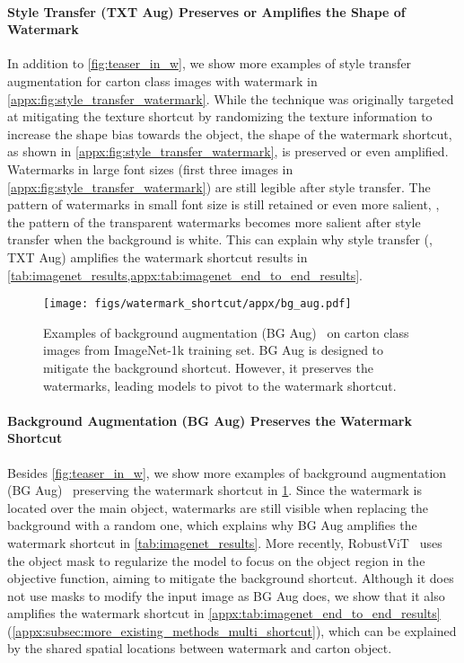 \documentclass[10pt,twocolumn,letterpaper]{article}
\begin{document}
\clearpage

\paragraph{Style Transfer (TXT Aug) Preserves or Amplifies the Shape of Watermark} In addition to \cref{fig:teaser_in_w}, we show more examples of style transfer~\cite{geirhos2019Int.Conf.Learn.Represent.ImageNettrained} augmentation for carton class images with watermark in \cref{appx:fig:style_transfer_watermark}. While the technique was originally targeted at mitigating the texture shortcut by randomizing the texture information to increase the shape bias towards the object, the shape of the watermark shortcut, as shown in \cref{appx:fig:style_transfer_watermark}, is preserved or even amplified. Watermarks in large font sizes (\cf first three images in \cref{appx:fig:style_transfer_watermark}) are still legible after style transfer. The pattern of watermarks in small font size is still retained or even more salient, \eg, the pattern of the transparent watermarks becomes more salient after style transfer when the background is white. This can explain why style transfer (\ie, TXT Aug) amplifies the watermark shortcut results in \cref{tab:imagenet_results,appx:tab:imagenet_end_to_end_results}.


\begin{figure}[t]
    \centering
    \texttt{[image: figs/watermark\_shortcut/appx/bg\_aug.pdf]}
    \caption{Examples of background augmentation (BG Aug)~\cite{xiao2021Int.Conf.Learn.Represent.Noise,ryali2021Characterizing} on carton class images from ImageNet-1k training set. BG Aug is designed to mitigate the background shortcut. However, it preserves the watermarks, leading models to pivot to the watermark shortcut.}
    \label{appx:fig:bg_aug_watermark}
\end{figure}

\paragraph{Background Augmentation (BG Aug) Preserves the Watermark Shortcut} Besides \cref{fig:teaser_in_w}, we show more examples of background augmentation (BG Aug)~\cite{xiao2021Int.Conf.Learn.Represent.Noise,ryali2021Characterizing} preserving the watermark shortcut in \cref{appx:fig:bg_aug_watermark}. Since the watermark is located over the main object, watermarks are still visible when replacing the background with a random one, which explains why BG Aug amplifies the watermark shortcut in \cref{tab:imagenet_results}. More recently, RobustViT~\cite{chefer2022Adv.NeuralInf.Process.Syst.Optimizing} uses the object mask to regularize the model to focus on the object region in the objective function, aiming to mitigate the background shortcut. Although it does not use masks to modify the input image as BG Aug does, we show that it also amplifies the watermark shortcut in \cref{appx:tab:imagenet_end_to_end_results} (\cf \cref{appx:subsec:more_existing_methods_multi_shortcut}), which can be explained by the shared spatial locations between watermark and carton object.
\end{document}

